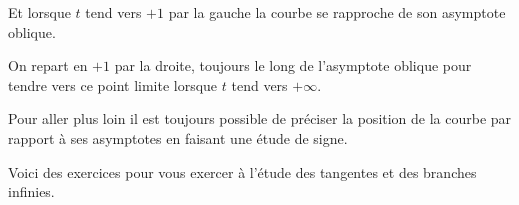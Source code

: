 Et lorsque $t$ tend vers $+1$ par la gauche la courbe se rapproche de son asymptote
oblique. 

\change
On repart en $+1$ par la droite, toujours le long de l'asymptote oblique
pour tendre vers ce point limite lorsque $t$ tend vers $+\infty$.


Pour aller plus loin il est toujours possible de préciser la position de 
la courbe par rapport à ses asymptotes en faisant une étude de signe.


\diapo

Voici des exercices pour vous exercer à l'étude des tangentes 
et des branches infinies.


